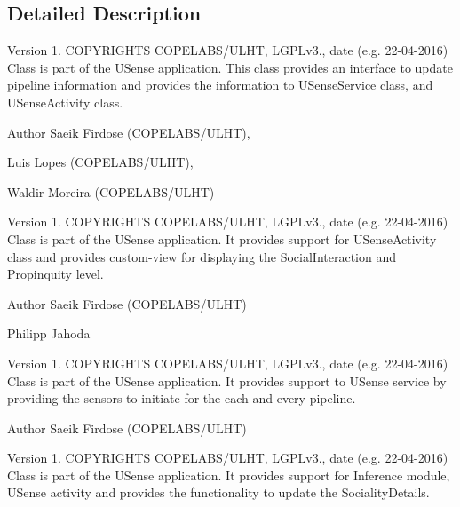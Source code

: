 \subsection{Detailed Description}
\begin{DoxyVersion}{Version}
1. C\+O\+P\+Y\+R\+I\+G\+H\+T\+S C\+O\+P\+E\+L\+A\+B\+S/\+U\+L\+H\+T, L\+G\+P\+Lv3., date (e.\+g. 22-\/04-\/2016) Class is part of the U\+Sense application. This class provides an interface to update pipeline information and provides the information to U\+Sense\+Service class, and U\+Sense\+Activity class. 
\end{DoxyVersion}
\begin{DoxyAuthor}{Author}
Saeik Firdose (C\+O\+P\+E\+L\+A\+B\+S/\+U\+L\+H\+T), 

Luis Lopes (C\+O\+P\+E\+L\+A\+B\+S/\+U\+L\+H\+T), 

Waldir Moreira (C\+O\+P\+E\+L\+A\+B\+S/\+U\+L\+H\+T)
\end{DoxyAuthor}
\begin{DoxyVersion}{Version}
1. C\+O\+P\+Y\+R\+I\+G\+H\+T\+S C\+O\+P\+E\+L\+A\+B\+S/\+U\+L\+H\+T, L\+G\+P\+Lv3., date (e.\+g. 22-\/04-\/2016) Class is part of the U\+Sense application. It provides support for U\+Sense\+Activity class and provides custom-\/view for displaying the Social\+Interaction and Propinquity level. 
\end{DoxyVersion}
\begin{DoxyAuthor}{Author}
Saeik Firdose (C\+O\+P\+E\+L\+A\+B\+S/\+U\+L\+H\+T) 

Philipp Jahoda
\end{DoxyAuthor}
\begin{DoxyVersion}{Version}
1. C\+O\+P\+Y\+R\+I\+G\+H\+T\+S C\+O\+P\+E\+L\+A\+B\+S/\+U\+L\+H\+T, L\+G\+P\+Lv3., date (e.\+g. 22-\/04-\/2016) Class is part of the U\+Sense application. It provides support to U\+Sense service by providing the sensors to initiate for the each and every pipeline. 
\end{DoxyVersion}
\begin{DoxyAuthor}{Author}
Saeik Firdose (C\+O\+P\+E\+L\+A\+B\+S/\+U\+L\+H\+T)
\end{DoxyAuthor}
\begin{DoxyVersion}{Version}
1. C\+O\+P\+Y\+R\+I\+G\+H\+T\+S C\+O\+P\+E\+L\+A\+B\+S/\+U\+L\+H\+T, L\+G\+P\+Lv3., date (e.\+g. 22-\/04-\/2016) Class is part of the U\+Sense application. It provides support for Inference module, U\+Sense activity and provides the functionality to update the Sociality\+Details. 
\end{DoxyVersion}

